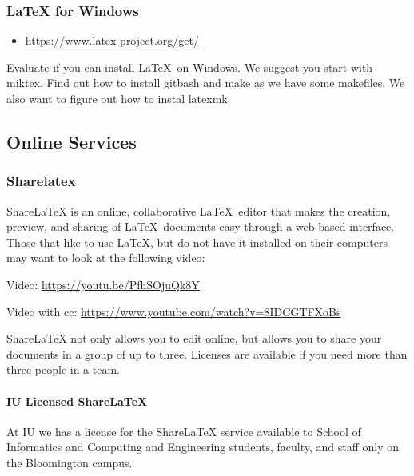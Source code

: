 \subsubsection{LaTeX for Windows}\label{latex-for-windows}

\begin{itemize}

\item
  \url{https://www.latex-project.org/get/}
\end{itemize}



\begin{exercise}

Evaluate if you can install \LaTeX~on Windows. We suggest you start
with miktex. Find out how to install gitbash and make as we have some
makefiles. We also want to figure out how to instal latexmk

\end{exercise}

\subsection{Online Services}\label{online-services}

\subsubsection{Sharelatex}\label{sharelatex}

ShareLaTeX is an online, collaborative \LaTeX~editor that makes the
creation, preview, and sharing of \LaTeX~documents easy through a
web-based interface.  Those that like to use \LaTeX, but do not have it
installed on their computers may want to look at the following video:

Video: \url{https://youtu.be/PfhSOjuQk8Y}

Video with cc: \url{https://www.youtube.com/watch?v=8IDCGTFXoBs}

ShareLaTeX not only allows you to edit online, but allows you to share
your documents in a group of up to three. Licenses are available if you
need more than three people in a team.

\paragraph{IU Licensed ShareLaTeX}

At IU we has a license for the ShareLaTeX service available to School
of Informatics and Computing and Engineering students, faculty, and
staff only on the Bloomington campus.  

